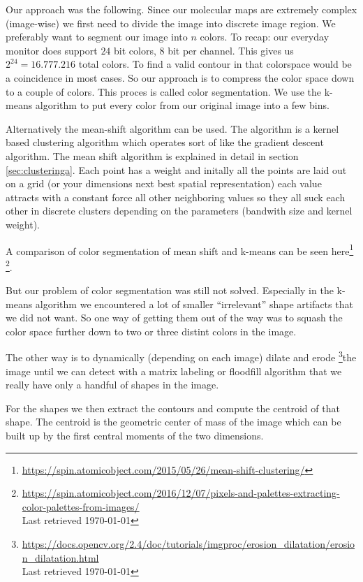 \documentclass[journal]{vgtc}       %
\begin{document}
Our approach was the following.  Since our molecular maps are extremely complex (image-wise) we first need to divide the image into discrete image region.  We preferably want to segment our image into $n$ colors. To recap: our everyday monitor does support \(24\) bit colors, \(8 \) bit per channel. This gives us \(2^{24}=16.777.216 \) total colors.
To find a valid contour in that colorspace would be a coincidence in most cases.
So our approach is to compress the color space down to a couple of colors.
This proces is called color segmentation. We use the k-means algorithm to put every color from our original image into a few bins.

Alternatively the mean-shift algorithm can be used. The algorithm is a kernel based clustering algorithm which operates sort of like the gradient descent algorithm. The mean shift algorithm is explained in detail in section \ref{sec:clusteringa}.
Each point has a weight and initally all the points are laid out on a grid (or your dimensions next best spatial representation) each value attracts with a constant force all other neighboring values so they all suck each other in discrete clusters depending on the parameters (bandwith size and kernel weight). 

A comparison of color segmentation of mean shift and  k-means can be seen here\footnote{\url{https://spin.atomicobject.com/2015/05/26/mean-shift-clustering/}} 
\footnote{\url{https://spin.atomicobject.com/2016/12/07/pixels-and-palettes-extracting-color-palettes-from-images/} \\ Last retrieved \today}. 


But our problem of color segmentation was still not solved. Especially in the k-means algorithm we encountered a lot of smaller ``irrelevant'' shape artifacts that we did not want.
So one way of getting them out of the way was to squash the color space further down to two or three distint colors in the image.

The other way is to  dynamically (depending on each image) dilate and erode \footnote{\url{https://docs.opencv.org/2.4/doc/tutorials/imgproc/erosion_dilatation/erosion_dilatation.html}\\ Last retrieved \today}the image until we can detect with a matrix labeling  or   floodfill algorithm that we really have only a handful of shapes in the image.

For the shapes we then extract the contours and compute the centroid of that shape.
The centroid is the geometric center of mass of the image which can be built up by the first central moments of the two dimensions.
\end{document}
